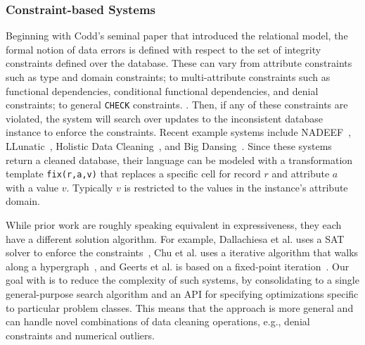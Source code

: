 \subsubsection{Constraint-based Systems}
Beginning with Codd's seminal paper that introduced the relational model, the formal notion of data errors is defined with respect to the set of integrity constraints defined over the database.   These can vary from attribute constraints such as type and domain constraints; to multi-attribute constraints such as functional dependencies, conditional functional dependencies, and denial constraints; to general \texttt{CHECK} constraints.   
.
Then, if any of these constraints are violated, the system will search over updates to the inconsistent database instance to enforce the constraints.
Recent example systems include NADEEF~\cite{DBLP:conf/sigmod/DallachiesaEEEIOT13}, LLunatic~\cite{geerts2013llunatic}, Holistic Data Cleaning~\cite{chu2013holistic}, and Big Dansing~\cite{khayyat2015bigdansing}.
Since these systems return a cleaned database, their language can be modeled with a transformation template \texttt{fix(r,a,v)} that replaces a specific cell for record $r$ and attribute $a$ with a value $v$.  Typically $v$ is restricted to the values in the instance's attribute domain.

While prior work are roughly speaking equivalent in expressiveness, they each have a different solution algorithm.
For example, Dallachiesa et al. uses a SAT solver to enforce the constraints~\cite{DBLP:conf/sigmod/DallachiesaEEEIOT13}, Chu et al. uses a iterative algorithm that walks along a hypergraph~\cite{chu2013holistic}, and Geerts et al. is based on a fixed-point iteration~\cite{geerts2013llunatic}.
Our goal with \sys is to reduce the complexity of such systems, by consolidating to a single general-purpose search algorithm and an API for specifying optimizations specific to particular problem classes.
This means that the approach is more general and can handle novel combinations of data cleaning operations, e.g., denial constraints and numerical outliers.


